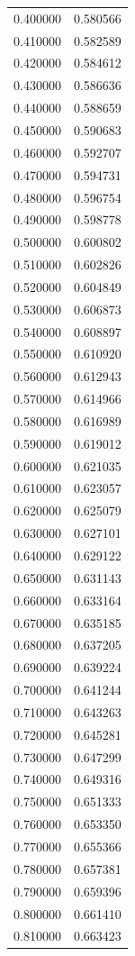 \begin{tabular}{rr}
0.400000 & 0.580566 \\
0.410000 & 0.582589 \\
0.420000 & 0.584612 \\
0.430000 & 0.586636 \\
0.440000 & 0.588659 \\
0.450000 & 0.590683 \\
0.460000 & 0.592707 \\
0.470000 & 0.594731 \\
0.480000 & 0.596754 \\
0.490000 & 0.598778 \\
0.500000 & 0.600802 \\
0.510000 & 0.602826 \\
0.520000 & 0.604849 \\
0.530000 & 0.606873 \\
0.540000 & 0.608897 \\
0.550000 & 0.610920 \\
0.560000 & 0.612943 \\
0.570000 & 0.614966 \\
0.580000 & 0.616989 \\
0.590000 & 0.619012 \\
0.600000 & 0.621035 \\
0.610000 & 0.623057 \\
0.620000 & 0.625079 \\
0.630000 & 0.627101 \\
0.640000 & 0.629122 \\
0.650000 & 0.631143 \\
0.660000 & 0.633164 \\
0.670000 & 0.635185 \\
0.680000 & 0.637205 \\
0.690000 & 0.639224 \\
0.700000 & 0.641244 \\
0.710000 & 0.643263 \\
0.720000 & 0.645281 \\
0.730000 & 0.647299 \\
0.740000 & 0.649316 \\
0.750000 & 0.651333 \\
0.760000 & 0.653350 \\
0.770000 & 0.655366 \\
0.780000 & 0.657381 \\
0.790000 & 0.659396 \\
0.800000 & 0.661410 \\
0.810000 & 0.663423 \\

\end{tabular}

